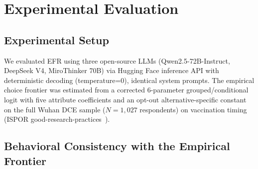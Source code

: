 \documentclass[11pt]{article}
\begin{document}
\clearpage
\section{Experimental Evaluation}

\subsection{Experimental Setup}
\label{sec:setup}

We evaluated EFR using three open-source LLMs (Qwen2.5-72B-Instruct, DeepSeek V4, MiroThinker 70B) via Hugging Face inference API with deterministic decoding (temperature=0), identical system prompts. The empirical choice frontier was estimated from a corrected 6-parameter grouped/conditional logit with five attribute coefficients and an opt-out alternative-specific constant on the full Wuhan DCE sample ($N=1{,}027$ respondents) on vaccination timing (ISPOR good-research-practices~\citep{Johnson2013DCE,Hauber2016DCE}).

\subsection{Behavioral Consistency with the Empirical Frontier}
\label{sec:behavioral_consistency}
\end{document}
